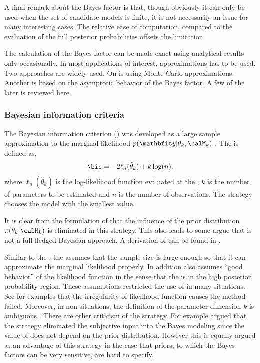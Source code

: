A final remark about the Bayes factor is that, though obviously it can only be
used when the set of candidate models is finite, it is not necessarily an
issue for many interesting cases. The relative ease of computation, compared
to the evaluation of the full posterior probabilities offsets the limitation.



The calculation of the Bayes factor can be made exact using analytical results
only occasionally. In most applications of interest, approximations has to be
used. Two approaches are widely used. On is using Monte Carlo approximations.
Another is based on the asymptotic behavior of the Bayes factor. A few of the
later is reviewed here.

\subsubsection{Bayesian information criteria}
\label{ssub:Bayesian information criteria}

The Bayesian information criterion (\bic) was developed as a large sample
approximation to the marginal likelihood $p(\data|\theta_k,\calM_k)$
\cite{Schwarz:1978uv}. The \bic is defined as,
\begin{equation}
  \text{\bic} = -2\ell_n(\hat\theta_k) + k\log(n).
  \label{eq:bic}
\end{equation}
where $\ell_n(\hat\theta_k)$ is the log-likelihood function evaluated at the
\mle, $k$ is the number of parameters to be estimated and $n$ is the number of
observations. The \bic strategy chooses the model with the smallest \bic
value.

It is clear from the formulation of \bic that the influence of the prior
distribution $\pi(\theta_k|\calM_k)$ is eliminated in this strategy. This also
leads to some argue that \bic is not a full fledged Bayesian approach. A
derivation of \bic can be found in \cite[][sec.~3.2]{Claeskens:2008tq}.

Similar to the \aic, the \bic assumes that the sample size is large enough so
that it can approximate the marginal likelihood properly. In addition \bic
also assumes ``good behavior'' of the likelihood function in the sense that
the \mle is in the high posterior probability region. These assumptions
restricted the use of \bic in many situations. See \cite{Berger:2001uy} for
examples that the irregularity of likelihood function causes the \bic method
failed. Moreover, in non-\iid situations, the definition of the parameter
dimension $k$ is ambiguous \cite{Spiegelhalter:1998uc, Kass:1995vb}. There are
other criticism of the \bic strategy. For example
\cite[][sec.~7.2.3]{Robert:2007tc} argued that the \bic strategy eliminated
the subjective input into the Bayes modeling since the value of \bic does not
depend on the prior distribution. However this is equally argued as an
advantage of this strategy in the case that priors, to which the Bayes factors
can be very sensitive, are hard to specify.

